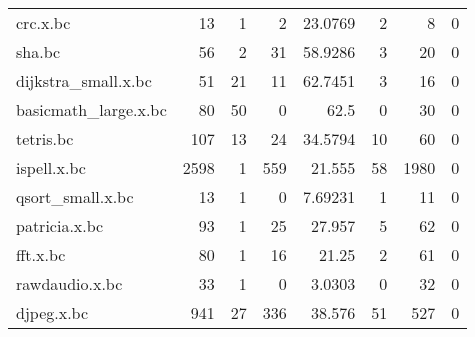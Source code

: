 \begin{table}[ht]
\begin{adjustbox}{width=1.3\textwidth}
\begin{tabular}{lrrrrrrr}
 crc.x.bc             &                 13 &                     1 &                           2 &               23.0769  &                     2 &                         8 &                             0 \\
 sha.bc               &                 56 &                     2 &                          31 &               58.9286  &                     3 &                        20 &                             0 \\
 dijkstra\_small.x.bc  &                 51 &                    21 &                          11 &               62.7451  &                     3 &                        16 &                             0 \\
 basicmath\_large.x.bc &                 80 &                    50 &                           0 &               62.5     &                     0 &                        30 &                             0 \\
 tetris.bc            &                107 &                    13 &                          24 &               34.5794  &                    10 &                        60 &                             0 \\
 ispell.x.bc          &               2598 &                     1 &                         559 &               21.555   &                    58 &                      1980 &                             0 \\
 qsort\_small.x.bc     &                 13 &                     1 &                           0 &                7.69231 &                     1 &                        11 &                             0 \\
 patricia.x.bc        &                 93 &                     1 &                          25 &               27.957   &                     5 &                        62 &                             0 \\
 fft.x.bc             &                 80 &                     1 &                          16 &               21.25    &                     2 &                        61 &                             0 \\
 rawdaudio.x.bc       &                 33 &                     1 &                           0 &                3.0303  &                     0 &                        32 &                             0 \\
 djpeg.x.bc           &                941 &                    27 &                         336 &               38.576   &                    51 &                       527 &                             0 \\

\end{tabular}
\end{adjustbox}
\end{table}
